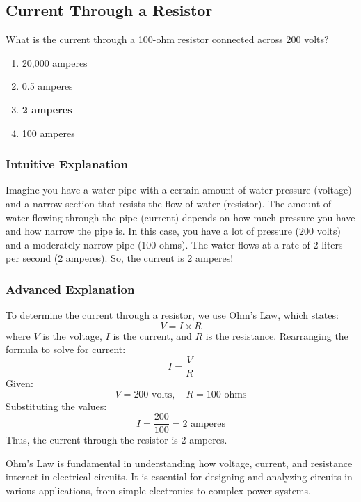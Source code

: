 \subsection{Current Through a Resistor}
\label{T5D08}

\begin{tcolorbox}[colback=gray!10!white,colframe=black!75!black,title=T5D08]
What is the current through a 100-ohm resistor connected across 200 volts?
\begin{enumerate}[label=\Alph*)]
    \item 20,000 amperes
    \item 0.5 amperes
    \item \textbf{2 amperes}
    \item 100 amperes
\end{enumerate}
\end{tcolorbox}

\subsubsection{Intuitive Explanation}
Imagine you have a water pipe with a certain amount of water pressure (voltage) and a narrow section that resists the flow of water (resistor). The amount of water flowing through the pipe (current) depends on how much pressure you have and how narrow the pipe is. In this case, you have a lot of pressure (200 volts) and a moderately narrow pipe (100 ohms). The water flows at a rate of 2 liters per second (2 amperes). So, the current is 2 amperes!

\subsubsection{Advanced Explanation}
To determine the current through a resistor, we use Ohm's Law, which states:
\[
V = I \times R
\]
where \( V \) is the voltage, \( I \) is the current, and \( R \) is the resistance. Rearranging the formula to solve for current:
\[
I = \frac{V}{R}
\]
Given:
\[
V = 200 \text{ volts}, \quad R = 100 \text{ ohms}
\]
Substituting the values:
\[
I = \frac{200}{100} = 2 \text{ amperes}
\]
Thus, the current through the resistor is 2 amperes.

Ohm's Law is fundamental in understanding how voltage, current, and resistance interact in electrical circuits. It is essential for designing and analyzing circuits in various applications, from simple electronics to complex power systems.

